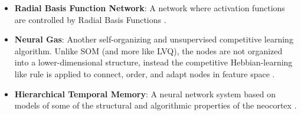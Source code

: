 \begin{bibunit}
\begin{itemize}
	\item \textbf{Radial Basis Function Network}: A network where activation functions are controlled by Radial Basis Functions \cite{Howlett2001}.
	\item \textbf{Neural Gas}: Another self-organizing and unsupervised competitive learning algorithm. Unlike SOM (and more like LVQ), the nodes are not organized into a lower-dimensional structure, instead the competitive Hebbian-learning like rule is applied to connect, order, and adapt nodes in feature space \cite{Martinetz1991, Martinetz1993, Martinetz1994}.
	\item \textbf{Hierarchical Temporal Memory}: A neural network system based on models of some of the structural and algorithmic properties of the neocortex \cite{Hawkins2005}.
\end{itemize}

\putbib
\end{bibunit}

\newpage\begin{bibunit}\putbib\end{bibunit}
\newpage\begin{bibunit}\putbib\end{bibunit}
\newpage\begin{bibunit}\putbib\end{bibunit}
\newpage\begin{bibunit}\putbib\end{bibunit}
\newpage\begin{bibunit}\putbib\end{bibunit}


